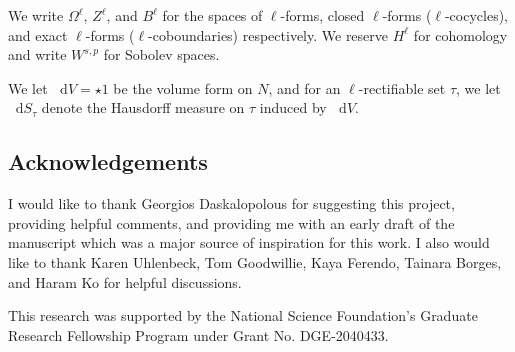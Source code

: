 \documentclass[reqno,11pt]{amsart}
\newcommand*\dif{\mathop{}\!\mathrm{d}}
\theoremstyle{definition}
\numberwithin{equation}{section}
\begin{document}
We write $\Omega^\ell$, $Z^\ell$, and $B^\ell$ for the spaces of $\ell$-forms, closed $\ell$-forms ($\ell$-cocycles), and exact $\ell$-forms ($\ell$-coboundaries) respectively.
We reserve $H^\ell$ for cohomology and write $W^{s, p}$ for Sobolev spaces.

We let $\dif V = \star 1$ be the volume form on $N$, and for an $\ell$-rectifiable set $\tau$, we let $\dif S_\tau$ denote the Hausdorff measure on $\tau$ induced by $\dif V$.

\subsection{Acknowledgements}
I would like to thank Georgios Daskalopolous for suggesting this project, providing helpful comments, and providing me with an early draft of the manuscript \cite{daskalopoulos2023} which was a major source of inspiration for this work.
I also would like to thank Karen Uhlenbeck, Tom Goodwillie, Kaya Ferendo, Tainara Borges, and Haram Ko for helpful discussions.

This research was supported by the National Science Foundation's Graduate Research Fellowship Program under Grant No. DGE-2040433.


\end{document}
